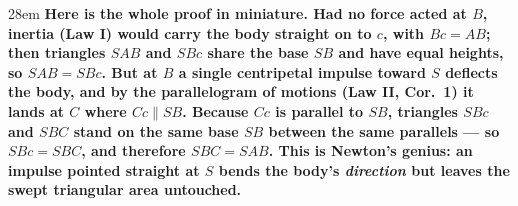 \documentclass[border=4pt]{standalone}
\begin{document}
\begin{varwidth}{28em}
\large\bfseries
Here is the whole proof in miniature. Had no force acted at $B$, inertia (\textbf{Law I}) would carry the      body straight on to $c$, with $Bc = AB$; then triangles $SAB$ and $SBc$ share the base      $SB$ and have equal heights, so \emph{$SAB = SBc$}. But at $B$ a single centripetal impulse toward      $S$ deflects the body, and by the parallelogram of motions (\textbf{Law II, Cor.~1}) it lands at $C$ where      $Cc \parallel SB$. Because $Cc$ is parallel to $SB$, triangles $SBc$ and $SBC$ stand on the same      base $SB$ between the same parallels — so \emph{$SBc = SBC$}, and therefore \emph{$SBC = SAB$}. This is      Newton's genius: an impulse pointed straight at $S$ bends the body's \emph{direction} but leaves the swept      triangular area untouched.
\end{varwidth}
\end{document}
